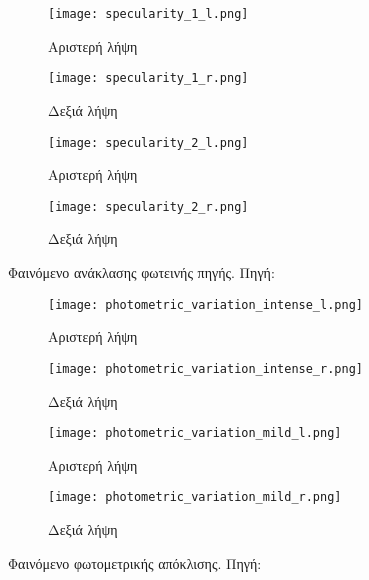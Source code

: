 \begin{figure}
	\centering
	\begin{subfigure}{.49\textwidth}
		\texttt{[image: specularity\_1\_l.png]}
		\caption{Αριστερή λήψη}
	\end{subfigure}
	\begin{subfigure}{.49\textwidth}
		\texttt{[image: specularity\_1\_r.png]}
		\caption{Δεξιά λήψη}
	\end{subfigure}
	
	\begin{subfigure}{.49\textwidth}
		\texttt{[image: specularity\_2\_l.png]}
		\caption{Αριστερή λήψη}
	\end{subfigure}
	\begin{subfigure}{.49\textwidth}
		\texttt{[image: specularity\_2\_r.png]}
		\caption{Δεξιά λήψη}
	\end{subfigure}
	\caption{Φαινόμενο ανάκλασης φωτεινής πηγής. Πηγή: \citep{TUMLesson}}
	\label{fig:specularity}
\end{figure}

\begin{figure}
	\centering
	\begin{subfigure}{.49\textwidth}
		\texttt{[image: photometric\_variation\_intense\_l.png]}
		\caption{Αριστερή λήψη}
	\end{subfigure}
	\begin{subfigure}{.49\textwidth}
		\texttt{[image: photometric\_variation\_intense\_r.png]}
		\caption{Δεξιά λήψη}
	\end{subfigure}

	\begin{subfigure}{.49\textwidth}
		\texttt{[image: photometric\_variation\_mild\_l.png]}
		\caption{Αριστερή λήψη}
	\end{subfigure}
	\begin{subfigure}{.49\textwidth}
		\texttt{[image: photometric\_variation\_mild\_r.png]}
		\caption{Δεξιά λήψη}
	\end{subfigure}
	\caption{Φαινόμενο φωτομετρικής απόκλισης. Πηγή: \citep{TUMLesson}}
	\label{fig:photometric_variation}
\end{figure}

